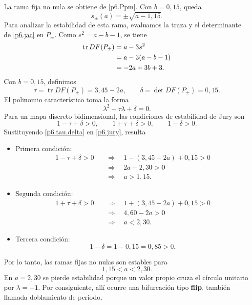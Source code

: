 \documentclass[12pt]{article}
\begin{document}
La rama fija no nula se obtiene de \eqref{p6.Ppm}. Con $b=0{,}15$, queda
\begin{equation}\label{p6.rama}
    s_\pm(a)=\pm\sqrt{a-1{,}15}.
\end{equation}
Para analizar la estabilidad de esta rama, evaluamos la traza y el determinante de \eqref{p6.jac} en $P_\pm$. Como $s^2=a-b-1$, se tiene
\begin{align}
    \operatorname{tr}DF(P_\pm)
    &=a-3s^2\notag\\
    &=a-3(a-b-1)\notag\\
    &=-2a+3b+3.
\end{align}
Con $b=0{,}15$, definimos
\begin{equation}\label{p6.tau.delta}
    \tau=\operatorname{tr}DF(P_\pm)=3{,}45-2a,
    \qquad
    \delta=\det DF(P_\pm)=0{,}15.
\end{equation}
El polinomio característico toma la forma
\begin{equation*}
    \lambda^2-\tau\lambda+\delta=0.
\end{equation*}
Para un mapa discreto bidimensional, las condiciones de estabilidad de Jury son
\begin{equation}\label{p6.jury}
    1-\tau+\delta>0,
    \qquad
    1+\tau+\delta>0,
    \qquad
    1-\delta>0.
\end{equation}
Sustituyendo \eqref{p6.tau.delta} en \eqref{p6.jury}, resulta
\begin{itemize}
    \item Primera condición:
    \begin{align*}
        1-\tau+\delta>0
        &\quad\Rightarrow\quad
        1-(3{,}45-2a)+0{,}15>0\\
        &\quad\Rightarrow\quad
        2a-2{,}30>0\\
        &\quad\Rightarrow\quad
        a>1{,}15.
    \end{align*}

    \item Segunda condición:
    \begin{align*}
        1+\tau+\delta>0
        &\quad\Rightarrow\quad
        1+(3{,}45-2a)+0{,}15>0\\
        &\quad\Rightarrow\quad
        4{,}60-2a>0\\
        &\quad\Rightarrow\quad
        a<2{,}30.
    \end{align*}

    \item Tercera condición:
    \begin{equation*}
        1-\delta=1-0{,}15=0{,}85>0.
    \end{equation*}
\end{itemize}
Por lo tanto, las ramas fijas no nulas son estables para
\begin{equation}\label{p6.estabilidad.ramas}
    1{,}15<a<2{,}30.
\end{equation}
En $a=2{,}30$ se pierde estabilidad porque un valor propio cruza el círculo unitario por $\lambda=-1$. Por consiguiente, allí ocurre una bifurcación tipo \textbf{flip}, también llamada doblamiento de período.
\end{document}
